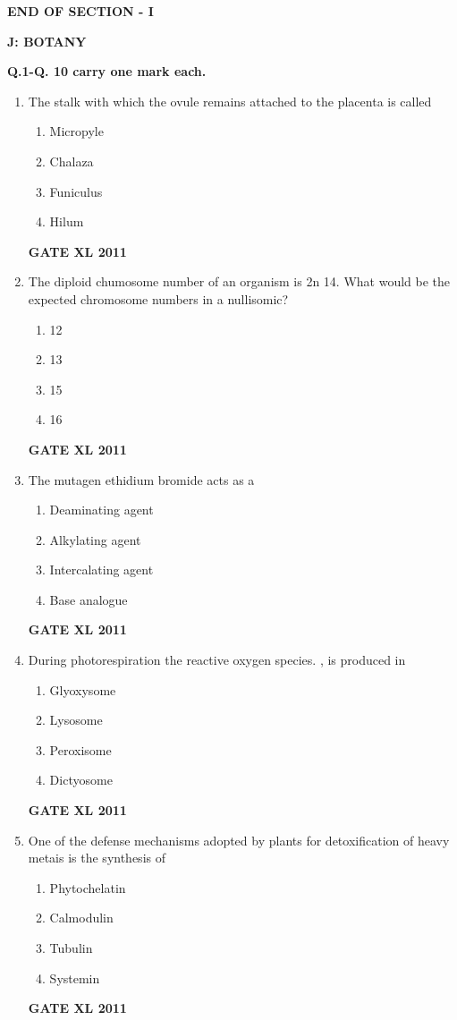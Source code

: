 \documentclass[journal,12pt,onecolumn]{IEEEtran}
\begin{document}
\begin{center}
\textbf{END OF SECTION - I}
\end{center}
\newpage
\textbf{J: BOTANY}

\textbf{Q.1-Q. 10 carry one mark each.}
\begin{enumerate}
\item {The stalk with which the ovule remains attached to the placenta is called}


		\begin{enumerate}
			\item Micropyle
			\item Chalaza
			\item Funiculus
			\item Hilum
		\end{enumerate}
		\hfill{\textbf{GATE XL 2011}}

\item {The diploid chumosome number of an organism is 2n 14. What would be the expected chromosome numbers in a nullisomic?}
		\begin{enumerate}
			\item 12
			\item 13
			\item 15
			\item 16
		\end{enumerate}
		\hfill{\textbf{GATE XL 2011}}

\item {The mutagen ethidium bromide acts as a}

		\begin{enumerate}
			\item Deaminating agent
			\item Alkylating agent
			\item Intercalating agent
			\item Base analogue
		\end{enumerate}
		\hfill{\textbf{GATE XL 2011}}

\item{During photorespiration the reactive oxygen species. , is produced in}
		\begin{enumerate}
			\item Glyoxysome
			\item Lysosome
			\item Peroxisome
			\item Dictyosome
		\end{enumerate}
		\hfill{\textbf{GATE XL 2011}}

\item{ One of the defense mechanisms adopted by plants for detoxification of heavy metais is the synthesis of}
		\begin{enumerate}
			\item Phytochelatin
			\item Calmodulin
			\item Tubulin
			\item Systemin
		\end{enumerate}
		\hfill{\textbf{GATE XL 2011}}


\end{enumerate}
\end{document}

